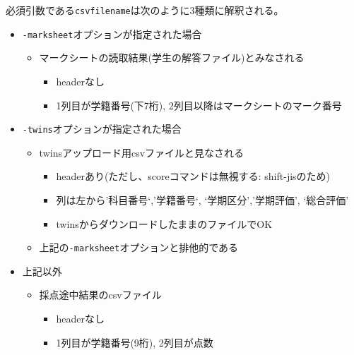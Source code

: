 必須引数である\texttt{csvfilename}は次のように3種類に解釈される。

\begin{itemize}
\item \texttt{-marksheet}オプションが指定された場合

\begin{itemize}
\item マークシートの読取結果(学生の解答ファイル)とみなされる

\begin{itemize}
\item headerなし

\item 1列目が学籍番号(下7桁), 2列目以降はマークシートのマーク番号

\end{itemize}

\end{itemize}

\item \texttt{-twins}オプションが指定された場合

\begin{itemize}
\item twinsアップロード用csvファイルと見なされる

\begin{itemize}
\item headerあり(ただし、scoreコマンドは無視する: shift-jisのため)

\item 列は左から'科目番号`,'学籍番号`, `学期区分','学期評価', `総合評価'

\item twinsからダウンロードしたままのファイルでOK

\end{itemize}

\item 上記の\texttt{-marksheet}オプションと排他的である

\end{itemize}

\item 上記以外

\begin{itemize}
\item 採点途中結果のcsvファイル

\begin{itemize}
\item headerなし

\item 1列目が学籍番号(9桁), 2列目が点数

\end{itemize}

\end{itemize}

\end{itemize}

